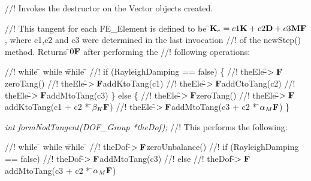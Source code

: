 //! Invokes the destructor on the Vector objects created.

//! This tangent for each FE\_Element is defined to be \f${\bf K}_e = c1 {\bf K}
+ c2  {\bf D} + c3 {\bf M}{\bf F}$, where c1,c2 and c3 were determined in the last invocation
//! of the newStep() method. Returns \f$0{\bf F}$ after performing the
//! following operations:  
\begin{tabbing}
//! while \= \+ while \= while \= \kill
//! if (RayleighDamping == false) \{ \+
//! theEle-\f$>{\bf F}$zeroTang()
//! theEle-\f$>{\bf F}$addKtoTang(c1)
//! theEle-\f$>{\bf F}$addCtoTang(c2)
//! theEle-\f$>{\bf F}$addMtoTang(c3)  \-
\} else \{ \+
//! theEle-\f$>{\bf F}$zeroTang()
//! theEle-\f$>{\bf F}$addKtoTang(c1 + c2 * \f$\beta_K{\bf F}$)
//! theEle-\f$>{\bf F}$addMtoTang(c3 + c2 * \f$\alpha_M{\bf F}$)  \- 
\}
\end{tabbing}

{\em int formNodTangent(DOF\_Group *theDof);}
//! This performs the following:
\begin{tabbing}
//! while \= \+ while \= while \= \kill
//! theDof-\f$>{\bf F}$zeroUnbalance()
//! if (RayleighDamping == false)  \+
//! theDof-\f$>{\bf F}$addMtoTang(c3)  \-
//! else \+
//! theDof-\f$>{\bf F}$addMtoTang(c3 + c2 * \f$\alpha_M{\bf F}$)  \- 
\end{tabbing}


